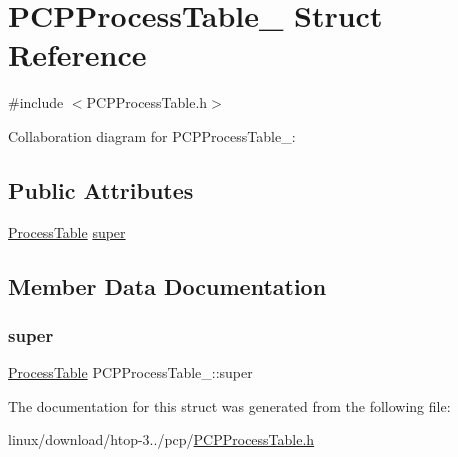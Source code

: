 \hypertarget{structPCPProcessTable__}{}\section{P\+C\+P\+Process\+Table\+\_\+ Struct Reference}
\label{structPCPProcessTable__}


{\ttfamily \#include $<$P\+C\+P\+Process\+Table.\+h$>$}



Collaboration diagram for P\+C\+P\+Process\+Table\+\_\+\+:
\subsection*{Public Attributes}
\begin{DoxyCompactItemize}
\item 
\hyperlink{ProcessTable_8h_a54ec62da6f9d80d4d06e3845a2597a80}{Process\+Table} \hyperlink{structPCPProcessTable___aa1d19f527f7475be92085cf8e1a4598f}{super}
\end{DoxyCompactItemize}


\subsection{Member Data Documentation}
\mbox{\label{structPCPProcessTable___aa1d19f527f7475be92085cf8e1a4598f}} 
\subsubsection{\texorpdfstring{super}{super}}
{\footnotesize\ttfamily \hyperlink{ProcessTable_8h_a54ec62da6f9d80d4d06e3845a2597a80}{Process\+Table} P\+C\+P\+Process\+Table\+\_\+\+::super}



The documentation for this struct was generated from the following file\+:\begin{DoxyCompactItemize}
\item 
linux/download/htop-\/3../pcp/\hyperlink{PCPProcessTable_8h}{P\+C\+P\+Process\+Table.\+h}\end{DoxyCompactItemize}
